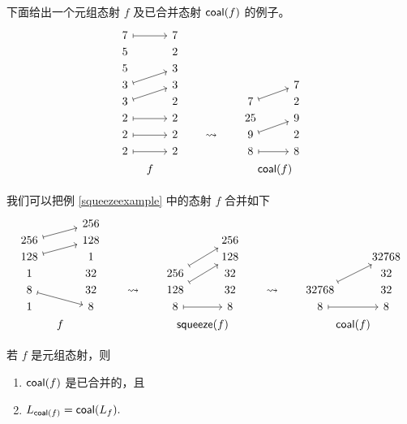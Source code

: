 \begin{example}
    下面给出一个元组态射 $f$ 及已合并态射 $\mathsf{coal}(f)$ 的例子。
    \[ \begin{tikzcd} [row sep = 1, column sep = 8]
    7 \ar[rr,mapsto] & & 7 & & & & & & \\
    5 & & 2 & & & & & & \\
    5 & & 3 & & & & & & \\
    3 \ar[urr,mapsto] & & 3 & & & & & & 7\\
    3 \ar[urr,mapsto] & & 2 & & & & 7 \ar[urr,mapsto] & & 2\\
    2 \ar[rr,mapsto] & & 2 & & & & 25 & & 9\\
    2 \ar[rr,mapsto] & & 2 & & \rightsquigarrow  & & 9 \ar[urr,mapsto] & & 2\\
    2 \ar[rr,mapsto] & & 2 & & & & 8 \ar[rr,mapsto] & & 8\\
    & f &  & & & & & \mathclap{\coalesce(f)} &\\
    \end{tikzcd} \]
\end{example}

\begin{example} 我们可以把例 \ref{squeezeexample} 中的态射 $f$ 合并如下
\[ \begin{tikzcd}[row sep = 1, column sep = 8]
 & & 256 & & & & & & \\
256 \ar[rru ,mapsto] & & 128   & & & & & & 256 \\
128 \ar[rru,mapsto] & & 1& & & & & & 128 & & & & & & 32768 \\
1 & & 32 & & & & 256 \ar[uurr,mapsto] & & 32 & & & & & & 32\\
8 \ar[drr,mapsto] & & 32 & & \rightsquigarrow & & 128 \ar[uurr,mapsto]  & & 32 & & \rightsquigarrow & & 32768 \ar[uurr,mapsto] & & 32\\
1 & & 8 & & & &  8 \ar[rr,mapsto] & & 8 & & & & 8 \ar[rr,mapsto] & & 8\\
& f & & & & & & \mathclap{\squeeze(f)} & & & & & & \mathclap{\coalesce(f)} & 
\end{tikzcd} \]
\end{example}



\begin{proposition}\label{coalesceinCproposition}
    若 $f$ 是元组态射，则
    \begin{enumerate}
    \item $\mathsf{coal}(f)$ 是已合并的，且 
    \item $ L_{\mathsf{coal}(f)} = \mathsf{coal}(L_f).$
    \end{enumerate}
\end{proposition}

